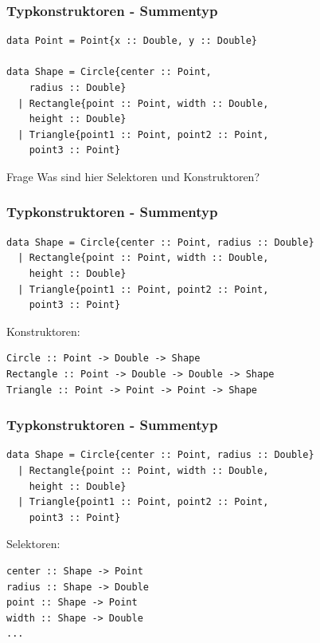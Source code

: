 \begin{frame}[fragile]
\frametitle{Typkonstruktoren - Summentyp} 
\begin{lstlisting}
data Point = Point{x :: Double, y :: Double}

data Shape = Circle{center :: Point, 
    radius :: Double}
  | Rectangle{point :: Point, width :: Double, 
    height :: Double}
  | Triangle{point1 :: Point, point2 :: Point, 
    point3 :: Point}
\end{lstlisting}

\begin{alertblock}{Frage}
Was sind hier Selektoren und Konstruktoren?
\end{alertblock}
\end{frame}

\begin{frame}[fragile]
\frametitle{Typkonstruktoren - Summentyp} 
\begin{lstlisting}
data Shape = Circle{center :: Point, radius :: Double}
  | Rectangle{point :: Point, width :: Double, 
    height :: Double}
  | Triangle{point1 :: Point, point2 :: Point, 
    point3 :: Point}
\end{lstlisting}
Konstruktoren: \pause
\begin{lstlisting}
Circle :: Point -> Double -> Shape
Rectangle :: Point -> Double -> Double -> Shape
Triangle :: Point -> Point -> Point -> Shape
\end{lstlisting}
\end{frame}

\begin{frame}[fragile]
\frametitle{Typkonstruktoren - Summentyp}
\begin{lstlisting}
data Shape = Circle{center :: Point, radius :: Double}
  | Rectangle{point :: Point, width :: Double, 
    height :: Double}
  | Triangle{point1 :: Point, point2 :: Point, 
    point3 :: Point}
\end{lstlisting} 
Selektoren: \pause
\begin{lstlisting}
center :: Shape -> Point
radius :: Shape -> Double
point :: Shape -> Point
width :: Shape -> Double
...
\end{lstlisting}
\end{frame}

